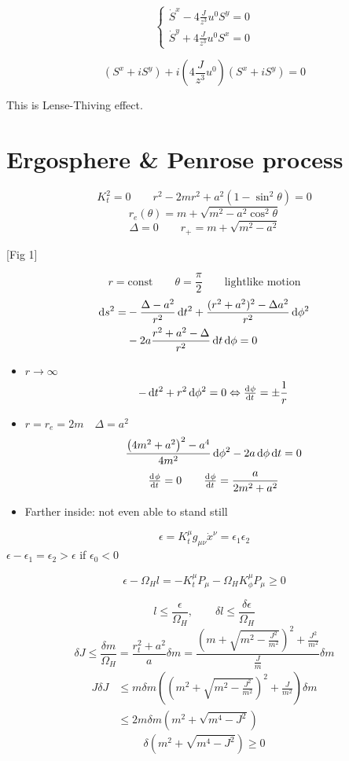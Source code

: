 \[ \begin{cases}
\dot{S}^x - 4 \frac{J}{z^3}u^0S^y = 0 \\
\dot{S}^y + 4 \frac{J}{z^3}u^0S^x = 0
\end{cases} \]

\[ \left(S^x + i S^y\right) + i \left(4 \frac{J}{z^3}u^0\right) \left(S^x + i S^y\right) = 0 \]

This is Lense-Thiving effect.
\section{Ergosphere \& Penrose process}
\[ K_t^2 = 0 \qquad r^2 - 2mr^2 + a^2 (1-\sin^2\theta) = 0 \]
\[ r_e(\theta) = m + \sqrt{m^2 - a^2\cos^2\theta} \]
\[ \Delta = 0 \qquad r_+ = m+\sqrt{m^2-a^2} \]

[Fig 1]

\[r = \text{const} \qquad \theta = \frac{\pi}{2} \qquad \text{lightlike motion}  \]
\begin{align*}
\operatorname{d \!}{s}^2 = &- \frac{\Delta - a^2}{r^2}\operatorname{d \!}{t}^2 + \frac{(r^2 + a^2)^2 - \Delta a^2}{r^2} \operatorname{d \!}{\phi^2} \\
&- 2a \frac{r^2+a^2 - \Delta}{r^2} \operatorname{d \!}{t}\operatorname{d \!}{\phi} = 0
\end{align*}

\begin{itemize}
\item $r \to \infty$
\[ - \diff{t}^2 + r^2 \diff{\phi}^2 = 0 \Leftrightarrow \od{\phi}{t} = \pm \frac{1}{r} \]
\item $r=r_e=2m \quad \Delta = a^2$
\[ \frac{\left(4m^2 + a^2\right)^2 - a^4}{4m^2}\operatorname{d \!}{\phi}^2 - 2a \operatorname{d \!}{\phi} \operatorname{d \!}{t} = 0 \]
\[ \od{\phi}{t} = 0 \qquad \od{\phi}{t} = \frac{a}{2m^2+a^2} \]
\item Farther inside: not even able to stand still
\end{itemize}

\[ \epsilon = K_t^\mu g_{\mu\nu}\dot{x}^\nu = \epsilon_1 \epsilon_2 \]
$\epsilon - \epsilon_1 = \epsilon_2 > \epsilon$ if $\epsilon_0 < 0$

\[ \epsilon - \Omega_H l = -K_t^\mu P_\mu - \Omega_H K_\phi^\mu P_\mu \geq 0 \]

\[ l \leq \frac{\epsilon}{\Omega_H}, \qquad \delta l \leq \frac{\delta \epsilon}{\Omega_H} \]
\[ \delta J \leq \frac{\delta m}{\Omega_H} = \frac{r_t^2 + a^2}{a}\delta m = \frac{\left(m+\sqrt{m^2 - \frac{J^2}{m^2}}\right)^2+ \frac{J^2}{m^2}}{\frac{J}{m}}\delta m \]
\begin{align*}
J\delta J &\leq m\delta m \left(\left(m^2 + \sqrt{m^2 - \frac{J^2}{m^2}}\right)^2 + \frac{J}{m^2}\right)\delta m \\
&\leq 2m \delta m \left(m^2 + \sqrt{m^4 - J^2}\right)
\end{align*}
\[ \boxed{\delta \left(m^2 + \sqrt{m^4 - J^2}\right) \geq 0} \]

